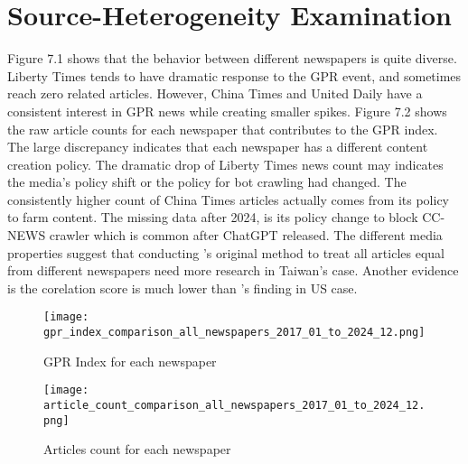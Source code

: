 
\chapter{Source-Heterogeneity Examination}

Figure 7.1 shows that the behavior between different newspapers is quite diverse. Liberty Times tends to have dramatic response to the GPR event, and sometimes reach zero related articles. However, China Times and United Daily have a consistent interest in GPR news while creating smaller spikes.
Figure 7.2 shows the raw article counts for each newspaper that contributes to the GPR index. The large discrepancy indicates that each newspaper has a different content creation policy. The dramatic drop of Liberty Times news count may indicates the media's policy shift or the policy for bot crawling had changed. The consistently higher count of China Times articles actually comes from its policy to farm content. The missing data after 2024, is its policy change to block CC-NEWS crawler which is common after ChatGPT released. The different media properties suggest that conducting \citet{caldara}'s original method to treat all articles equal from different newspapers need more research in Taiwan's case.
Another evidence is the corelation score is much lower than  \citet{caldara}'s finding in US case.

\begin{figure}[htbp]
  \centering
  \texttt{[image: gpr\_index\_comparison\_all\_newspapers\_2017\_01\_to\_2024\_12.png]}
  \caption{GPR Index for each newspaper}
  \label{fig:my_example}
\end{figure}

\begin{figure}[htbp]
  \centering
  \texttt{[image: article\_count\_comparison\_all\_newspapers\_2017\_01\_to\_2024\_12.png]}
  \caption{Articles count for each newspaper}
  \label{fig:my_example}
\end{figure}